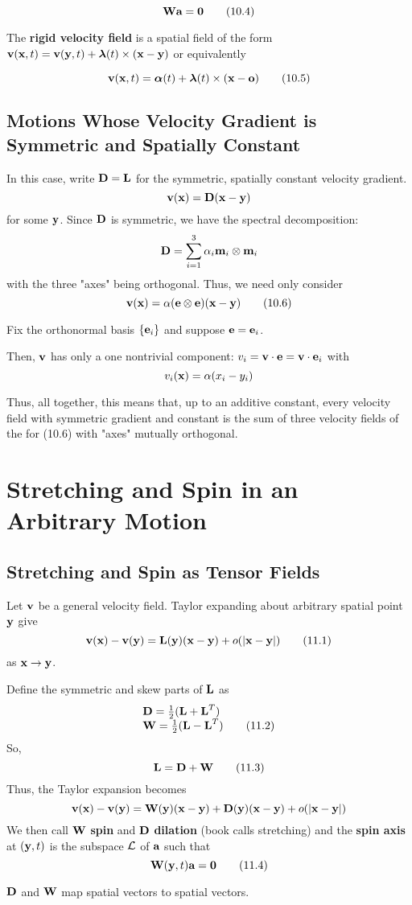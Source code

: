 \documentclass{article}
\begin{document}
\[
	\textbf{W}\textbf{a} = \textbf{0}\tag{10.4}
\]

The \textbf{rigid velocity field} is a spatial field of the form $\textbf{v}(\textbf{x},t) = \textbf{v}(\textbf{y},t) + \boldsymbol{\lambda}(t)\times(\textbf{x} - \textbf{y})$ or equivalently

\[
	\textbf{v}(\textbf{x},t) = \boldsymbol{\alpha}(t) + \boldsymbol{\lambda}(t)\times(\textbf{x}-\textbf{o})\tag{10.5}
\] 
\subsection{Motions Whose Velocity Gradient is Symmetric and Spatially Constant}
In this case, write $\textbf{D} = \textbf{L}$ for the symmetric, spatially constant velocity gradient.
\[
	\textbf{v}(\textbf{x}) = \textbf{D}(\textbf{x}-\textbf{y})
\]
for some $\textbf{y}$. Since $\textbf{D}$ is symmetric, we have the spectral decomposition:
\[
	\textbf{D} = \sum_{i=1}^{3}\alpha_i\textbf{m}_i\otimes\textbf{m}_i
\]
with the three "axes" being orthogonal. Thus, we need only consider
\[
	\textbf{v}(\textbf{x}) = \alpha(\textbf{e}\otimes\textbf{e})(\textbf{x}-\textbf{y})\tag{10.6}
\]

Fix the orthonormal basis $\lbrace \textbf{e}_i\rbrace$ and suppose $\textbf{e} = \textbf{e}_i$. 

Then, $\textbf{v}$ has only a one nontrivial component: $v_i = \textbf{v}\cdot\textbf{e} = \textbf{v}\cdot\textbf{e}_i$ with
\[
	v_i(\textbf{x}) = \alpha(x_i-y_i)
\]

\begin{remark}
	Thus, all together, this means that, up to an additive constant, every velocity field with symmetric gradient and constant is the sum of three velocity fields of the for (10.6) with "axes" mutually orthogonal.
\end{remark}

\section{Stretching and Spin in an Arbitrary Motion}
\subsection{Stretching and Spin as Tensor Fields}
Let $\textbf{v}$ be a general velocity field. Taylor expanding about arbitrary spatial point $\textbf{y}$ give
\[
	\textbf{v}(\textbf{x}) - \textbf{v}(\textbf{y}) = \textbf{L}(\textbf{y})(\textbf{x} - \textbf{y}) + o(|\textbf{x} - \textbf{y}|)\tag{11.1}
\]
as $\textbf{x}\to\textbf{y}$.

Define the symmetric and skew parts of $\textbf{L}$ as
\[
\begin{array}{l}
\textbf{D} = \frac{1}{2}(\textbf{L} + \textbf{L}^T)\\
\textbf{W} = \frac{1}{2}(\textbf{L} - \textbf{L}^T)\tag{11.2}
\end{array}
\]
So,
\[
	\textbf{L} = \textbf{D} + \textbf{W}\tag{11.3}
\]
Thus, the Taylor expansion becomes
\[
	\textbf{v}(\textbf{x}) - \textbf{v}(\textbf{y}) = \textbf{W}(\textbf{y})(\textbf{x} - \textbf{y}) + \textbf{D}(\textbf{y})(\textbf{x} - \textbf{y}) + o(|\textbf{x} - \textbf{y}|)
\]
We then call $\textbf{W}$ \textbf{spin} and $\textbf{D}$ \textbf{dilation} (book calls stretching) and the \textbf{spin axis} at $(\textbf{y},t)$ is the subspace $\mathcal{L}$ of $\textbf{a}$ such that
\[
	\textbf{W}(\textbf{y},t)\textbf{a} = \boldsymbol{0}\tag{11.4}
\]
\begin{remark}
	$\textbf{D}$ and $\textbf{W}$ map spatial vectors to spatial vectors.
\end{remark}
\end{document}
